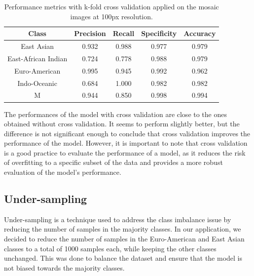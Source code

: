 \begin{table}[H]
	\centering
	\begin{tabular}{|c|c|c|c|c|}
		\hline
		\textbf{Class}      & \textbf{Precision} & \textbf{Recall} & \textbf{Specificity} & \textbf{Accuracy} \\
		\hline
		East Asian          & 0.932              & 0.988           & 0.977                & 0.979             \\
		East-African Indian & 0.724              & 0.778           & 0.988                & 0.979             \\
		Euro-American       & 0.995              & 0.945           & 0.992                & 0.962             \\
		Indo-Oceanic        & 0.684              & 1.000           & 0.982                & 0.982             \\
		M                   & 0.944              & 0.850           & 0.998                & 0.994             \\
		\hline
	\end{tabular}
	\caption{Performance metrics with k-fold cross validation applied on the mosaic images at 100px resolution.}
	\label{tab:kfold_performance_metrics_mosaic}
\end{table}

The performances of the model with cross validation are close to the ones obtained without cross validation. It seems to perform slightly
better, but the difference is not significant enough to conclude that cross validation improves the performance of the model. However, it is
important to note that cross validation is a good practice to evaluate the performance of a model, as it reduces the risk of overfitting
to a specific subset of the data and provides a more robust evaluation of the model's performance.

\subsection{Under-sampling}
\label{subsec:under_sampling}

Under-sampling is a technique used to address the class imbalance issue by reducing the number of samples in the majority classes. In our
application, we decided to reduce the number of samples in the Euro-American and East Asian classes to a total of 1000 samples each, while keeping
the other classes unchanged. This was done to balance the dataset and ensure that the model is not biased towards the majority classes.

